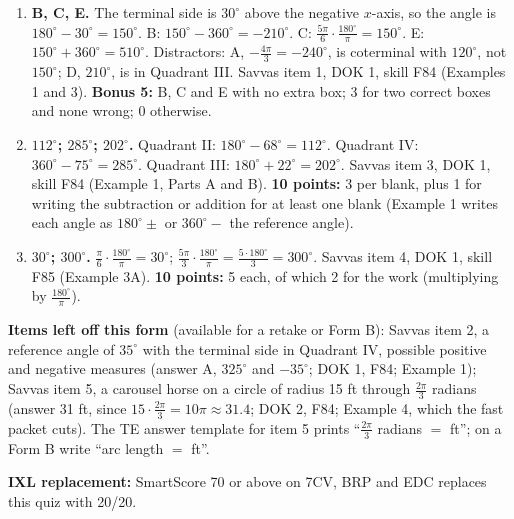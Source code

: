 \documentclass[11pt]{article}
\begin{document}
\begin{enumerate}
\item \textbf{B, C, E.} The terminal side is $30^\circ$ above the negative $x$-axis, so the angle is $180^\circ-30^\circ=150^\circ$. B: $150^\circ-360^\circ=-210^\circ$. C: $\tfrac{5\pi}{6}\cdot\tfrac{180^\circ}{\pi}=150^\circ$. E: $150^\circ+360^\circ=510^\circ$. Distractors: A, $-\tfrac{4\pi}{3}=-240^\circ$, is coterminal with $120^\circ$, not $150^\circ$; D, $210^\circ$, is in Quadrant III. Savvas item 1, DOK 1, skill F84 (Examples 1 and 3). \textbf{Bonus 5:} B, C and E with no extra box; 3 for two correct boxes and none wrong; 0 otherwise.
\setcounter{enumi}{2}
\item \textbf{$112^\circ$; $285^\circ$; $202^\circ$.} Quadrant II: $180^\circ-68^\circ=112^\circ$. Quadrant IV: $360^\circ-75^\circ=285^\circ$. Quadrant III: $180^\circ+22^\circ=202^\circ$. Savvas item 3, DOK 1, skill F84 (Example 1, Parts A and B). \textbf{10 points:} 3 per blank, plus 1 for writing the subtraction or addition for at least one blank (Example 1 writes each angle as $180^\circ\pm$ or $360^\circ-$ the reference angle).
\item \textbf{$30^\circ$; $300^\circ$.} $\tfrac{\pi}{6}\cdot\tfrac{180^\circ}{\pi}=30^\circ$; $\tfrac{5\pi}{3}\cdot\tfrac{180^\circ}{\pi}=\tfrac{5\cdot180^\circ}{3}=300^\circ$. Savvas item 4, DOK 1, skill F85 (Example 3A). \textbf{10 points:} 5 each, of which 2 for the work (multiplying by $\tfrac{180^\circ}{\pi}$).
\end{enumerate}

\textbf{Items left off this form} (available for a retake or Form B): Savvas item 2, a reference angle of $35^\circ$ with the terminal side in Quadrant IV, possible positive and negative measures (answer A, $325^\circ$ and $-35^\circ$; DOK 1, F84; Example 1); Savvas item 5, a carousel horse on a circle of radius 15 ft through $\tfrac{2\pi}{3}$ radians (answer 31 ft, since $15\cdot\tfrac{2\pi}{3}=10\pi\approx31.4$; DOK 2, F84; Example 4, which the fast packet cuts). The TE answer template for item 5 prints ``$\tfrac{2\pi}{3}$ radians $=$ \underline{\quad} ft''; on a Form B write ``arc length $=$ \underline{\quad} ft''.

\textbf{IXL replacement:} SmartScore 70 or above on 7CV, BRP and EDC replaces this quiz with 20/20.
\end{document}
